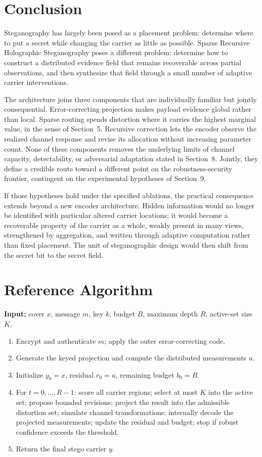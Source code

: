\documentclass[11pt]{article}
\begin{document}
\section{Conclusion}

Steganography has largely been posed as a placement problem: determine where to put a secret while changing the carrier as little as possible. Sparse Recursive Holographic Steganography poses a different problem: determine how to construct a distributed evidence field that remains recoverable across partial observations, and then synthesize that field through a small number of adaptive carrier interventions.

The architecture joins three components that are individually familiar but jointly consequential. Error-correcting projection makes payload evidence global rather than local. Sparse routing spends distortion where it carries the highest marginal value, in the sense of Section~5. Recursive correction lets the encoder observe the realized channel response and revise its allocation without increasing parameter count. None of these components removes the underlying limits of channel capacity, detectability, or adversarial adaptation stated in Section~8. Jointly, they define a credible route toward a different point on the robustness-security frontier, contingent on the experimental hypotheses of Section~9.

If those hypotheses hold under the specified ablations, the practical consequence extends beyond a new encoder architecture. Hidden information would no longer be identified with particular altered carrier locations; it would become a recoverable property of the carrier as a whole, weakly present in many views, strengthened by aggregation, and written through adaptive computation rather than fixed placement. The unit of steganographic design would then shift from the secret bit to the secret field.

\appendix

\section{Reference Algorithm}

\textbf{Input:} cover $x$, message $m$, key $k$, budget $B$, maximum depth $R$, active-set size $K$.

\begin{enumerate}[label=\arabic*.,leftmargin=1.6em]
\item Encrypt and authenticate $m$; apply the outer error-correcting code.
\item Generate the keyed projection and compute the distributed measurements $u$.
\item Initialize $y_0 = x$, residual $r_0 = u$, remaining budget $b_0 = B$.
\item For $t = 0,\dots,R-1$: score all carrier regions; select at most $K$ into the active set; propose bounded revisions; project the result into the admissible distortion set; simulate channel transformations; internally decode the projected measurements; update the residual and budget; stop if robust confidence exceeds the threshold.
\item Return the final stego carrier $y$.
\end{enumerate}
\end{document}
